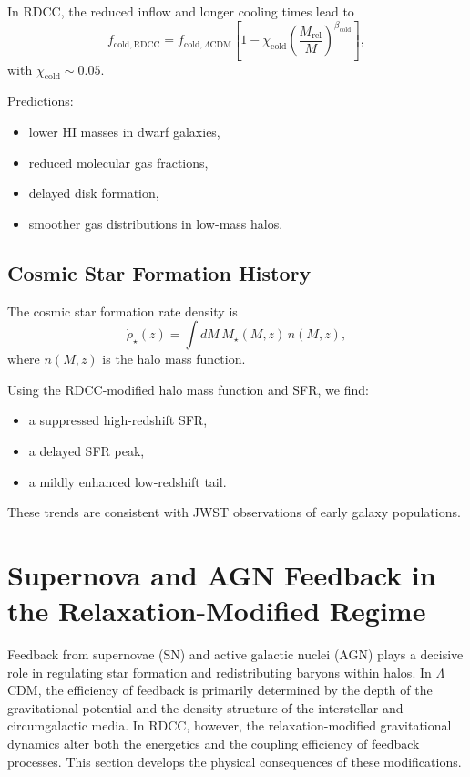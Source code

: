 \documentclass[11pt,a4paper]{article}
\begin{document}
In RDCC, the reduced inflow and longer cooling times lead to
\begin{equation}
f_{\mathrm{cold,RDCC}}
=
f_{\mathrm{cold},\Lambda\mathrm{CDM}}
\left[
1
-
\chi_{\mathrm{cold}}
\left(
\frac{M_{\mathrm{rel}}}{M}
\right)^{\beta_{\mathrm{cold}}}
\right],
\end{equation}
with $\chi_{\mathrm{cold}} \sim 0.05$.

Predictions:
\begin{itemize}
\item lower HI masses in dwarf galaxies,
\item reduced molecular gas fractions,
\item delayed disk formation,
\item smoother gas distributions in low-mass halos.
\end{itemize}

\subsection{Cosmic Star Formation History}

The cosmic star formation rate density is
\begin{equation}
\dot{\rho}_{\star}(z)
=
\int dM\,
\dot{M}_{\star}(M,z)\,
n(M,z),
\end{equation}
where $n(M,z)$ is the halo mass function.

Using the RDCC-modified halo mass function and SFR, we find:
\begin{itemize}
\item a suppressed high-redshift SFR,
\item a delayed SFR peak,
\item a mildly enhanced low-redshift tail.
\end{itemize}

These trends are consistent with JWST observations of early galaxy populations.

\section{Supernova and AGN Feedback in the Relaxation-Modified Regime}

Feedback from supernovae (SN) and active galactic nuclei (AGN) plays a decisive role in
regulating star formation and redistributing baryons within halos. In $\Lambda$CDM, the
efficiency of feedback is primarily determined by the depth of the gravitational potential and
the density structure of the interstellar and circumgalactic media. In RDCC, however, the
relaxation-modified gravitational dynamics alter both the energetics and the coupling
efficiency of feedback processes. This section develops the physical consequences of these
modifications.
\end{document}
